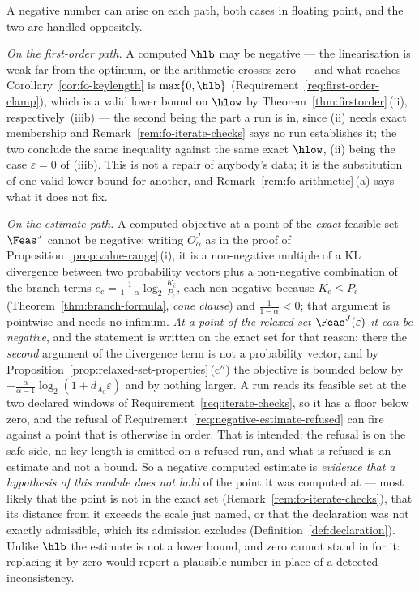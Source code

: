\begin{remark}\label{rem:fo-negative-values}
A negative number can arise on each path, both cases in floating point, and
the two are handled oppositely.

\emph{On the first-order path.} A computed $\hlb$ may be negative --- the
linearisation is weak far from the optimum, or the arithmetic crosses
zero --- and what reaches Corollary~\ref{cor:fo-keylength} is
$\max\{0,\hlb\}$ (Requirement~\ref{req:first-order-clamp}), which is a
valid lower bound on $\hlow$ by Theorem~\ref{thm:firstorder}\,(ii),
respectively~(iiib) --- the second being the part a run is in, since (ii)
needs exact membership and Remark~\ref{rem:fo-iterate-checks} says no run
establishes it; the two conclude the same inequality against the same exact
$\hlow$, (ii) being the case $\varepsilon=0$ of (iiib). This is not a repair
of anybody's data; it is the substitution of one valid lower bound for
another, and Remark~\ref{rem:fo-arithmetic}\,(a) says what it does not fix.

\emph{On the estimate path.} A computed objective at a point of the
\emph{exact} feasible set $\Feas^{J}$ cannot be negative: writing
$O^{J}_{\alpha}$ as in the proof of
Proposition~\ref{prop:value-range}\,(i), it is a non-negative multiple of a
KL divergence between two probability vectors plus a non-negative
combination of the branch terms
$e_{\hat c}=\frac{1}{1-\alpha}\log_2\frac{K_{\hat c}}{P_{\hat c}}$, each
non-negative because $K_{\hat c}\le P_{\hat c}$
(Theorem~\ref{thm:branch-formula}, \emph{cone clause}) and
$\frac{1}{1-\alpha}<0$; that argument is pointwise and needs no infimum.
\emph{At a point of the relaxed set $\Feas^{J}(\varepsilon)$ it can be
negative}, and the statement is written on the exact set for that reason:
there the \emph{second} argument of the divergence term is not a
probability vector, and by
Proposition~\ref{prop:relaxed-set-properties}\,(c$''$) the objective is
bounded below by $-\frac{\alpha}{\alpha-1}\log_2(1+d_{A_0}\varepsilon)$ and
by nothing larger. A run reads its feasible set at the two declared windows
of Requirement~\ref{req:iterate-checks}, so it has a floor below zero, and
the refusal of Requirement~\ref{req:negative-estimate-refused} can fire
against a point that is otherwise in order. That is intended: the refusal is
on the safe side, no key length is emitted on a refused run, and what is
refused is an estimate and not a bound. So a negative computed estimate is
\emph{evidence that a hypothesis of this module does not hold} of the point
it was computed at --- most likely that the point is not in the exact set
(Remark~\ref{rem:fo-iterate-checks}), that its distance from it exceeds the
scale just named, or that the declaration was not exactly admissible, which
its admission excludes (Definition~\ref{def:declaration}). Unlike $\hlb$ the
estimate is not a lower bound, and zero cannot stand in for it: replacing it
by zero would report a plausible number in place of a detected
inconsistency.
\end{remark}
